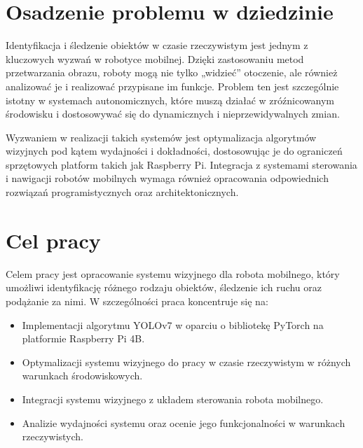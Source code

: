 \documentclass[a4paper,twoside,12pt]{book}
\begin{document}
\section{Osadzenie problemu w dziedzinie}
Identyfikacja i śledzenie obiektów w czasie rzeczywistym jest jednym z kluczowych wyzwań w robotyce mobilnej. Dzięki zastosowaniu metod przetwarzania obrazu, roboty mogą nie tylko „widzieć” otoczenie, ale również analizować je i realizować przypisane im funkcje. Problem ten jest szczególnie istotny w systemach autonomicznych, które muszą działać w zróźnicowanym środowisku i dostosowywać się do dynamicznych i nieprzewidywalnych zmian.

Wyzwaniem w realizacji takich systemów jest optymalizacja algorytmów wizyjnych pod kątem wydajności i dokładności, dostosowując je do ograniczeń sprzętowych platform takich jak Raspberry Pi. Integracja z systemami sterowania i nawigacji robotów mobilnych wymaga również opracowania odpowiednich rozwiązań programistycznych oraz architektonicznych.

\section{Cel pracy}
Celem pracy jest opracowanie systemu wizyjnego dla robota mobilnego, który umożliwi identyfikację różnego rodzaju obiektów, śledzenie ich ruchu oraz podążanie za nimi. W szczególności praca koncentruje się na:
\begin{itemize}
    \item Implementacji algorytmu YOLOv7 w oparciu o bibliotekę PyTorch na platformie Raspberry Pi 4B.
    \item Optymalizacji systemu wizyjnego do pracy w czasie rzeczywistym w różnych warunkach środowiskowych.
    \item Integracji systemu wizyjnego z układem sterowania robota mobilnego.
    \item Analizie wydajności systemu oraz ocenie jego funkcjonalności w warunkach rzeczywistych.
\end{itemize}

\newpage
\end{document}
